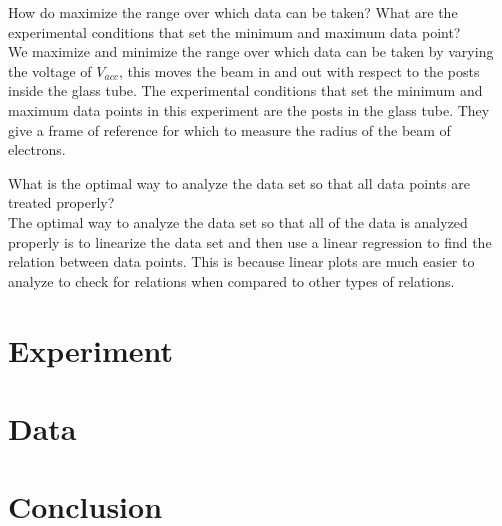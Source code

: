 \documentclass[aps,prl,10pt,twocolumn,floatfix]{revtex4-2}
\begin{document}
How do maximize the range over which data can be taken? What are the experimental conditions that
set the minimum and maximum data point?\\
We maximize and minimize the range over which data can be taken by varying the voltage of $V_{acc}$, this moves the beam in and out with respect to the posts inside the glass tube.
The experimental conditions that set the minimum and maximum data points in this experiment are the posts in the glass tube.
They give a frame of reference for which to measure the radius of the beam of electrons.

What is the optimal way to analyze the data set so that all data points are treated properly?\\
The optimal way to analyze the data set so that all of the data is analyzed properly is to linearize the data set and then use a linear regression to find the relation between data points.
This is because linear plots are much easier to analyze to check for relations when compared to other types of relations.

\section{Experiment}

\section{Data}

\section{Conclusion}
\end{document}
